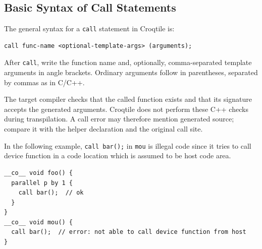 \subsection*{Basic Syntax of Call Statements}

The general syntax for a \texttt{call} statement in Croqtile is:

\begin{lstlisting}[language=croqtile,caption={The general call syntax}]
call func-name <optional-template-args> (arguments);
\end{lstlisting}

After \texttt{call}, write the function name and, optionally, comma-separated template arguments in angle brackets. Ordinary arguments follow in parentheses, separated by commas as in C/C++.

The target compiler checks that the called function exists and that its signature accepts the generated arguments. Croqtile does not perform these C++ checks during transpilation. A call error may therefore mention generated source; compare it with the helper declaration and the original call site.

In the following example, \texttt{call bar();} in \texttt{mou} is illegal code since it tries to call device function in a code location which is assumed to be host code area.

\begin{lstlisting}[language=croqtile,caption={An illegal call site}]
__co__ void foo() {
  parallel p by 1 {
    call bar();  // ok
  }
}
__co__ void mou() {
  call bar();  // error: not able to call device function from host
}
\end{lstlisting}
